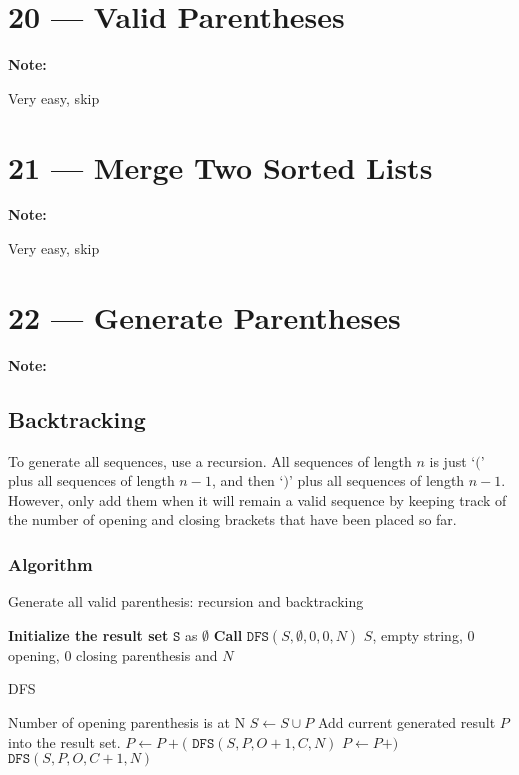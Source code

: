 \documentclass[a4paper,12pt]{article}
\begin{document}
\section{20 --- Valid Parentheses}
\textbf{\large{Note:}}
\par
Very easy, skip

\section{21 --- Merge Two Sorted Lists}
\textbf{\large{Note:}}
\par
Very easy, skip

\section{22 --- Generate Parentheses}
\textbf{\large{Note:}}
\subsection{Backtracking}
To generate all sequences, use a recursion. All sequences of length $n$ is just `$($' plus all sequences of length $n-1$, and then `$)$' plus all sequences of length $n-1$. However, only add them when it will remain a valid sequence by keeping track of the number of opening and closing brackets that have been placed so far.
\subsubsection{Algorithm}
\setcounter{algorithm}{0}
\begin{algorithm}[H]
\caption{Generate all valid parenthesis: recursion and backtracking}
\begin{algorithmic}[1]
\Statex
{}
\State \textbf{Initialize the result set} $\mathtt{S}$ as $\emptyset$
\State \textbf{Call} $\mathtt{DFS}(S, \emptyset, 0, 0, N)$ \Comment $S$, empty string, 0 opening,  0 closing parenthesis and $N$
\EndProcedure
\Statex
\end{algorithmic}
\end{algorithm}

\begin{algorithm}[H]
\caption{DFS}
\begin{algorithmic}[1]
\Statex
{}
 \Comment Number of opening parenthesis is at N
\State $S\gets S\cup P$ \Comment Add current generated result $P$ into the result set.
\State \Return
\EndIf
{}
\State $P\gets P+($ 
\State $\mathtt{DFS}(S, P, O+1, C, N)$
\EndIf
{}
\State $P\gets P+)$ 
\State $\mathtt{DFS}(S, P, O, C+1, N)$
\EndIf
\EndProcedure
\Statex
\end{algorithmic}
\end{algorithm}
\end{document}
